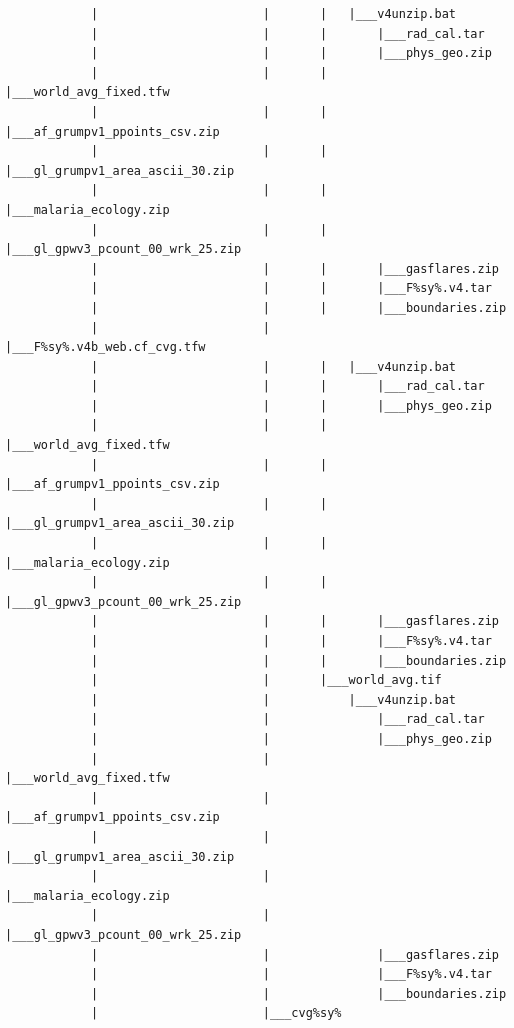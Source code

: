 \documentclass[
]{book}
\begin{document}
\begin{verbatim}
            |                       |       |   |___v4unzip.bat
            |                       |       |       |___rad_cal.tar
            |                       |       |       |___phys_geo.zip
            |                       |       |       |___world_avg_fixed.tfw
            |                       |       |       |___af_grumpv1_ppoints_csv.zip
            |                       |       |       |___gl_grumpv1_area_ascii_30.zip
            |                       |       |       |___malaria_ecology.zip
            |                       |       |       |___gl_gpwv3_pcount_00_wrk_25.zip
            |                       |       |       |___gasflares.zip
            |                       |       |       |___F%sy%.v4.tar
            |                       |       |       |___boundaries.zip
            |                       |       |___F%sy%.v4b_web.cf_cvg.tfw
            |                       |       |   |___v4unzip.bat
            |                       |       |       |___rad_cal.tar
            |                       |       |       |___phys_geo.zip
            |                       |       |       |___world_avg_fixed.tfw
            |                       |       |       |___af_grumpv1_ppoints_csv.zip
            |                       |       |       |___gl_grumpv1_area_ascii_30.zip
            |                       |       |       |___malaria_ecology.zip
            |                       |       |       |___gl_gpwv3_pcount_00_wrk_25.zip
            |                       |       |       |___gasflares.zip
            |                       |       |       |___F%sy%.v4.tar
            |                       |       |       |___boundaries.zip
            |                       |       |___world_avg.tif
            |                       |           |___v4unzip.bat
            |                       |               |___rad_cal.tar
            |                       |               |___phys_geo.zip
            |                       |               |___world_avg_fixed.tfw
            |                       |               |___af_grumpv1_ppoints_csv.zip
            |                       |               |___gl_grumpv1_area_ascii_30.zip
            |                       |               |___malaria_ecology.zip
            |                       |               |___gl_gpwv3_pcount_00_wrk_25.zip
            |                       |               |___gasflares.zip
            |                       |               |___F%sy%.v4.tar
            |                       |               |___boundaries.zip
            |                       |___cvg%sy%

\end{verbatim}
\end{document}
